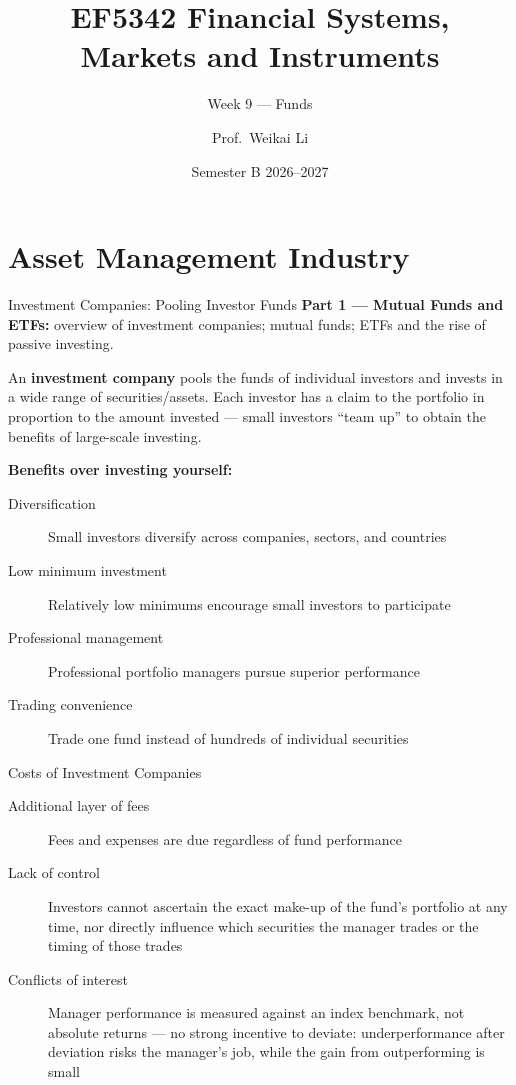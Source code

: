 \documentclass[aspectratio=169]{beamer}
\title{EF5342 Financial Systems, Markets and Instruments}
\subtitle{Week 9 --- Funds}
\author{Prof.\ Weikai Li}
\institute{City University of Hong Kong}
\date{Semester B 2026--2027}
\begin{document}
\begin{frame}
\titlepage
\end{frame}

\section{Asset Management Industry}

\begin{frame}{Investment Companies: Pooling Investor Funds}
\textbf{Part 1 --- Mutual Funds and ETFs:} overview of investment companies; mutual funds; ETFs and the rise of passive investing.
\vspace{0.4em}

An \textbf{investment company} pools the funds of individual investors and invests in a wide range of securities/assets. Each investor has a claim to the portfolio in proportion to the amount invested --- small investors ``team up'' to obtain the benefits of large-scale investing.
\vspace{0.4em}

\textbf{Benefits over investing yourself:}
\begin{description}
  \item[Diversification] Small investors diversify across companies, sectors, and countries
  \item[Low minimum investment] Relatively low minimums encourage small investors to participate
  \item[Professional management] Professional portfolio managers pursue superior performance
  \item[Trading convenience] Trade one fund instead of hundreds of individual securities
\end{description}
\end{frame}

\begin{frame}{Costs of Investment Companies}
\begin{description}
  \item[Additional layer of fees] Fees and expenses are due regardless of fund performance
  \item[Lack of control] Investors cannot ascertain the exact make-up of the fund's portfolio at any time, nor directly influence which securities the manager trades or the timing of those trades
  \item[Conflicts of interest] Manager performance is measured against an index benchmark, not absolute returns --- no strong incentive to deviate: underperformance after deviation risks the manager's job, while the gain from outperforming is small
\end{description}
\end{frame}
\end{document}

